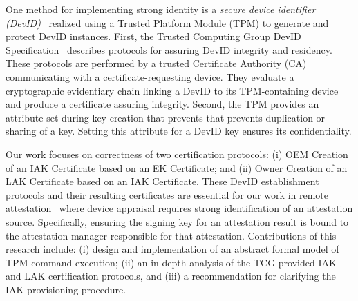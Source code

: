 \documentclass[runningheads]{llncs}
\begin{document}
One method for implementing strong identity is a \emph{secure device
  identifier (DevID)}~\citep{DevIDSpec-IEEE} realized using a Trusted
Platform Module (TPM) to generate and protect DevID instances.  First,
the Trusted Computing Group DevID Specification~\citep{DevIDSpec-TCG}
describes protocols for assuring DevID integrity and residency. These
protocols are performed by a trusted Certificate Authority (CA)
communicating with a certificate-requesting device.  They evaluate a
cryptographic evidentiary chain linking a DevID to its TPM-containing
device and produce a certificate assuring integrity.  Second, the TPM
provides an attribute set during key creation that prevents that
prevents duplication or sharing of a key.  Setting this attribute for
a DevID key ensures its confidentiality.

Our work focuses on correctness of two certification protocols:
(i) OEM Creation of an IAK Certificate based on an EK Certificate; and
(ii) Owner Creation of an LAK Certificate based on an IAK
Certificate. These DevID establishment protocols and their resulting
certificates are essential for our work in remote
attestation~\citep{Coker::Principles-of-R,petz2022innovations} where
device appraisal requires strong identification of an attestation
source. Specifically, ensuring the signing key for an attestation
result is bound to the attestation manager responsible for that
attestation.  Contributions of this research include: (i) design and
implementation of an abstract formal model of TPM command execution;
(ii) an in-depth analysis of the TCG-provided IAK and LAK
certification protocols, and (iii) a recommendation for clarifying the
IAK provisioning procedure.
\end{document}
